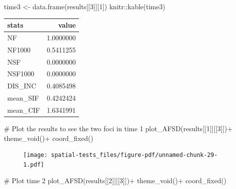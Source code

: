 \documentclass[
  letterpaper,
]{book}
\newenvironment{Shaded}{\begin{snugshade}}{\end{snugshade}}
\newcommand{\CommentTok}[1]{\textcolor[rgb]{0.37,0.37,0.37}{#1}}
\newcommand{\DecValTok}[1]{\textcolor[rgb]{0.68,0.00,0.00}{#1}}
\newcommand{\FunctionTok}[1]{\textcolor[rgb]{0.28,0.35,0.67}{#1}}
\newcommand{\NormalTok}[1]{\textcolor[rgb]{0.00,0.23,0.31}{#1}}
\newcommand{\OtherTok}[1]{\textcolor[rgb]{0.00,0.23,0.31}{#1}}
\newcommand{\SpecialCharTok}[1]{\textcolor[rgb]{0.37,0.37,0.37}{#1}}
\begin{document}
\begin{Shaded}
\begin{Highlighting}[]
\NormalTok{time3 }\OtherTok{\textless{}{-}} \FunctionTok{data.frame}\NormalTok{(results[[}\DecValTok{3}\NormalTok{]][}\DecValTok{1}\NormalTok{])}
\NormalTok{knitr}\SpecialCharTok{::}\FunctionTok{kable}\NormalTok{(time3)}
\end{Highlighting}
\end{Shaded}

\begin{longtable}[]{@{}lr@{}}
\toprule\noalign{}
stats & value \\
\midrule\noalign{}
\endhead
\bottomrule\noalign{}
\endlastfoot
NF & 1.0000000 \\
NF1000 & 0.5411255 \\
NSF & 0.0000000 \\
NSF1000 & 0.0000000 \\
DIS\_INC & 0.4085498 \\
mean\_SIF & 0.4242424 \\
mean\_CIF & 1.6341991 \\
\end{longtable}

\begin{Shaded}
\begin{Highlighting}[]
\CommentTok{\# Plot the results to see the two foci in time 1}
\FunctionTok{plot\_AFSD}\NormalTok{(results[[}\DecValTok{1}\NormalTok{]][[}\DecValTok{3}\NormalTok{]])}\SpecialCharTok{+}
  \FunctionTok{theme\_void}\NormalTok{()}\SpecialCharTok{+}
  \FunctionTok{coord\_fixed}\NormalTok{()}
\end{Highlighting}
\end{Shaded}

\begin{figure}[H]

\texttt{[image: spatial-tests\_files/figure-pdf/unnamed-chunk-29-1.pdf]} \hfill{}

\end{figure}

\begin{Shaded}
\begin{Highlighting}[]
\CommentTok{\# Plot time 2}
\FunctionTok{plot\_AFSD}\NormalTok{(results[[}\DecValTok{2}\NormalTok{]][[}\DecValTok{3}\NormalTok{]])}\SpecialCharTok{+}
  \FunctionTok{theme\_void}\NormalTok{()}\SpecialCharTok{+}
  \FunctionTok{coord\_fixed}\NormalTok{()}
\end{Highlighting}
\end{Shaded}
\end{document}
